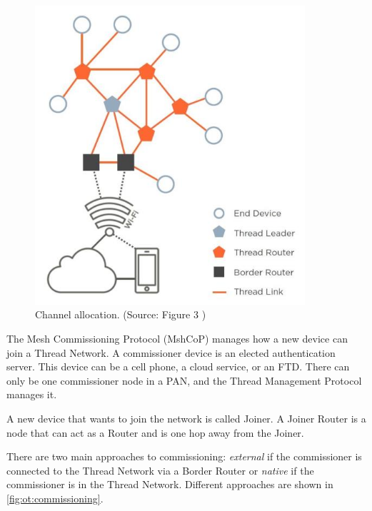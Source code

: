 \begin{figure}[!ht]
    \centering
    \includegraphics[width=100mm, keepaspectratio]{figures/thread-topology-ThreadNetworkFundamentals_633_4.jpg}
    \caption{Channel allocation. (Source: Figure 3 \cite{thread:nfwp})}
    \label{fig:ot:network}
\end{figure}

The Mesh Commissioning Protocol (MshCoP) manages how a new device can join a Thread Network.
A commissioner device is an elected authentication server.
This device can be a cell phone, a cloud service, or an FTD.
There can only be one commissioner node in a PAN, and the Thread Management Protocol manages it.

A new device that wants to join the network is called Joiner.
A Joiner Router is a node that can act as a Router and is one hop away from the Joiner.

There are two main approaches to commissioning:
\emph{external} if the commissioner is connected to the Thread Network via a Border Router or
\emph{native} if the commissioner is in the Thread Network.
Different approaches are shown in \autoref{fig:ot:commissioning}.


